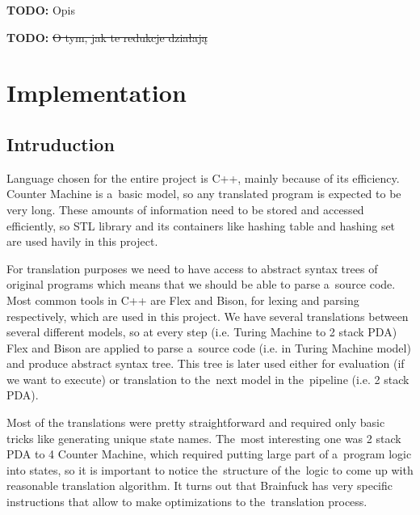 \documentclass[english,shortabstract,mgr]{iithesis}
\newcommand{\todo}[1]{\textbf{TODO:} #1}
\begin{document}
\todo{Opis}


\todo{\sout{O tym, jak te redukcje działają}}

\chapter{Implementation}

\section{Intruduction}

Language chosen for the entire project is C++, mainly because of its efficiency. Counter Machine
is a~basic model, so any translated program is expected to be very long. These amounts of information
need to be stored and accessed efficiently, so STL library and its containers like hashing table
and hashing set are used havily in this project.

For translation purposes we need to have access to abstract syntax trees of original programs which
means that we should be able to parse a~source code. Most common tools in C++ are Flex and Bison,
for lexing and parsing respectively, which are used in this project. We have several translations
between several different models, so at every step (i.e. Turing Machine to 2 stack PDA) Flex and Bison
are applied to parse a~source code (i.e. in Turing Machine model) and produce abstract syntax tree.
This tree is later used either for evaluation (if we want to execute) or translation to the~next
model in the~pipeline (i.e. 2 stack PDA).

Most of the translations were pretty straightforward and required only basic tricks like
generating unique state names. The~most interesting one was 2 stack PDA to 4 Counter Machine,
which required putting large part of a~program logic into states, so it is important
to notice the~structure of the~logic to come up with reasonable translation algorithm.
It turns out that Brainfuck has very specific instructions that allow to make optimizations
to the~translation process.
\end{document}
